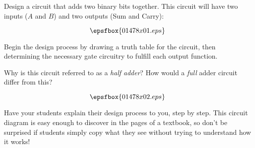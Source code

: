 

Design a circuit that adds two binary bits together.  This circuit will have two inputs ($A$ and $B$) and two outputs (Sum and Carry):

$$\epsfbox{01478x01.eps}$$

Begin the design process by drawing a truth table for the circuit, then determining the necessary gate circuitry to fulfill each output function.

\vskip 10pt

Why is this circuit referred to as a {\it half adder}?  How would a {\it full} adder circuit differ from this?







$$\epsfbox{01478x02.eps}$$







Have your students explain their design process to you, step by step.  This circuit diagram is easy enough to discover in the pages of a textbook, so don't be surprised if students simply copy what they see without trying to understand how it works!




